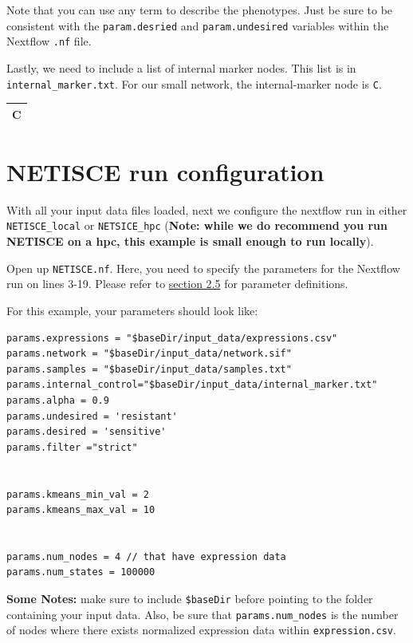 \documentclass[
]{book}
\begin{document}
Note that you can use any term to describe the phenotypes. Just be sure to be consistent with the \texttt{param.desried} and \texttt{param.undesired} variables within the Nextflow \texttt{.nf} file.

Lastly, we need to include a list of internal marker nodes. This list is in \texttt{internal\_marker.txt}. For our small network, the internal-marker node is \texttt{C}.

\begin{tabular}{l}
\hline
C\\


\hline
\end{tabular}

\hypertarget{netisce-run-configuration}{%
\section{NETISCE run configuration}\label{netisce-run-configuration}}

With all your input data files loaded, next we configure the nextflow run in either \texttt{NETISCE\_local} or \texttt{NETSICE\_hpc} (\textbf{Note: while we do recommend you run NETISCE on a hpc, this example is small enough to run locally}).

Open up \texttt{NETISCE.nf}. Here, you need to specify the parameters for the Nextflow run on lines 3-19. Please refer to \protect\hyperlink{params}{section 2.5} for parameter definitions.

For this example, your parameters should look like:

\begin{verbatim}
params.expressions = "$baseDir/input_data/expressions.csv"
params.network = "$baseDir/input_data/network.sif"
params.samples = "$baseDir/input_data/samples.txt"
params.internal_control="$baseDir/input_data/internal_marker.txt"
params.alpha = 0.9
params.undesired = 'resistant'
params.desired = 'sensitive'
params.filter ="strict"


params.kmeans_min_val = 2
params.kmeans_max_val = 10


params.num_nodes = 4 // that have expression data
params.num_states = 100000
\end{verbatim}

\textbf{Some Notes: } make sure to include \texttt{\$baseDir} before pointing to the folder containing your input data. Also, be sure that \texttt{params.num\_nodes} is the number of nodes where there exists normalized expression data within \texttt{expression.csv}.
\end{document}
